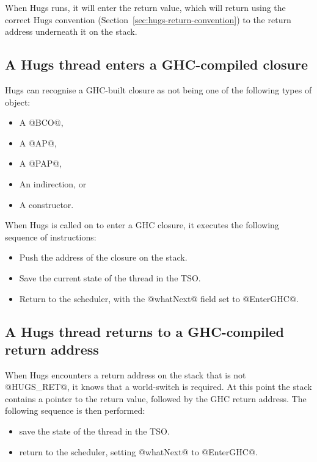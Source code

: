 \documentclass[11pt]{article}
\newcommand{\secref}[1]{Section~\ref{sec:#1}}
\begin{document}
\noindent When Hugs runs, it will enter the return value, which will
return using the correct Hugs convention
(\secref{hugs-return-convention}) to the return address underneath it
on the stack.

\subsection{A Hugs thread enters a GHC-compiled closure}
\label{sec:hugs-to-ghc-switch}

Hugs can recognise a GHC-built closure as not being one of the
following types of object:

\begin{itemize}
\item A @BCO@,
\item A @AP@,
\item A @PAP@,
\item An indirection, or
\item A constructor.
\end{itemize}

When Hugs is called on to enter a GHC closure, it executes the
following sequence of instructions:

\begin{itemize}
\item Push the address of the closure on the stack.
\item Save the current state of the thread in the TSO.
\item Return to the scheduler, with the @whatNext@ field set to
@EnterGHC@.
\end{itemize}

\subsection{A Hugs thread returns to a GHC-compiled return address}
\label{sec:hugs-to-ghc-switch}

When Hugs encounters a return address on the stack that is not
@HUGS_RET@, it knows that a world-switch is required.  At this point
the stack contains a pointer to the return value, followed by the GHC
return address.  The following sequence is then performed:

\begin{itemize}
\item save the state of the thread in the TSO.
\item return to the scheduler, setting @whatNext@ to @EnterGHC@.
\end{itemize}
\end{document}
